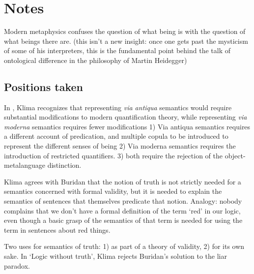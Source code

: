 \documentclass[]{article}
\begin{document}
\section{Notes}
Modern metaphysics confuses the question of what being is with the question of what beings there are. (this isn't a new insight: once one gets past the mysticism of some of his interpreters, this is the fundamental point behind the talk of ontological difference in the philosophy of Martin Heidegger)
\subsection{Positions taken}
In \autocite{Klima2008a}, Klima recognizes that representing \emph{via antiqua} semantics would require substantial modifications to modern quantification theory, while representing \emph{via moderna} semantics requires fewer modifications
1) Via antiqua semantics requires a different account of predication, and multiple copula to be introduced to represent the different senses of being
2) Via moderna semantics requires the introduction of restricted quantifiers.
3) both require the rejection of the object-metalanguage distinction.

Klima agrees with Buridan that the notion of truth is not strictly needed for a semantics concerned with formal validity, but it is needed to explain the semantics of sentences that themselves predicate that notion.
Analogy: nobody complains that we don't have a formal definition of the term `red' in our logic, even though a basic grasp of the semantics of that term is needed for using the term in sentences about red things.

Two uses for semantics of truth: 1) as part of a theory of validity, 2) for its own sake.
In `Logic without truth', Klima rejects Buridan's solution to the liar paradox.




\end{document}
